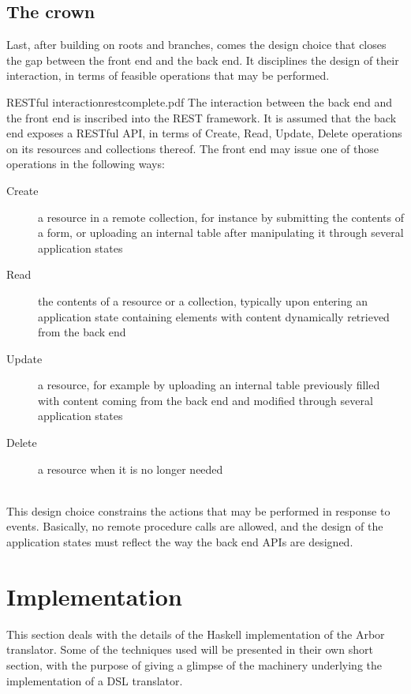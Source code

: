 \documentclass[12pt]{article} %
\newcommand{\be}{back end}
\newcommand{\fe}{front end}
\newcommand{\DSL}{DSL}
\newcommand{\A}{Arbor}
\newcommand{\Hs}{Haskell}
\begin{document}
\subsection{The crown}
Last, after building on roots and branches, comes the design choice that closes the gap between the \fe{} and the \be{}. It disciplines the design of their interaction, in terms of feasible operations that may be performed. \\
\begin{dce}{RESTful interaction}{rest}{complete.pdf}
The interaction between the \be{} and the \fe{} is inscribed into the REST framework. It is assumed that the \be{} exposes a RESTful API, in terms of Create, Read, Update, Delete operations on its resources and collections thereof.  The \fe{} may issue one of those operations in the following ways:
\begin{description}
\item[Create] a resource in a remote collection, for instance by submitting the contents of a form, or uploading an internal table after manipulating it through several application states
\item[Read] the contents of a resource or a collection, typically upon entering an application state containing elements with content dynamically retrieved from the \be{}
\item[Update] a resource, for example by uploading an internal table previously filled with content coming from the \be{} and modified through several application states
\item[Delete] a resource when it is no longer needed
\end{description}
\end{dce}

~\\
This design choice constrains the actions that may be performed in response to events. Basically, no remote procedure calls are allowed, and the design of the application states must reflect the way the \be{} APIs are designed.

\section{Implementation}\label{implementation}
This section deals with the details of the \Hs{} implementation of the \A{} translator. Some of the techniques used will be presented in their own short section, with the purpose of giving a glimpse of the machinery underlying the implementation of a \DSL{} translator.
\end{document}
